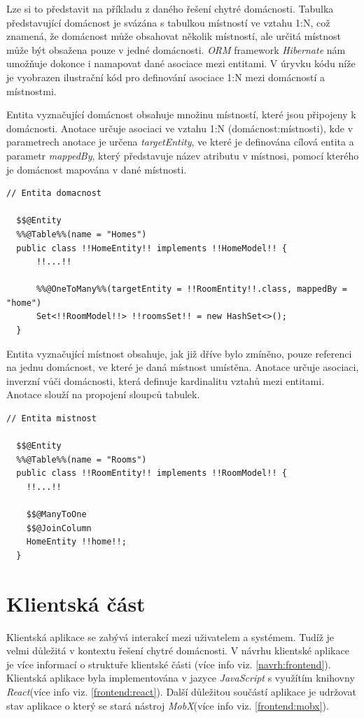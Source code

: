 Lze si to představit na příkladu z daného řešení chytré domácnosti.
Tabulka představující domácnost je svázána s tabulkou místností ve vztahu 1:N, což znamená, že domácnost může obsahovat několik místností, ale určitá místnost může být obsažena pouze v jedné domácnosti.
\emph{ORM} framework \emph{Hibernate} nám umožňuje dokonce i namapovat dané asociace mezi entitami.
V úryvku kódu níže je vyobrazen ilustrační kód pro definování asociace 1:N mezi domácností a místnostmi.

Entita vyznačující domácnost obsahuje množinu místností, které jsou připojeny k domácnosti.
Anotace  určuje asociaci ve vztahu 1:N (domácnost:místnosti), kde v parametrech anotace je určena \emph{targetEntity}, ve které je definována cílová entita a
parametr \emph{mappedBy}, který představuje název atributu v místnosi, pomocí kterého je domácnost mapována v dané místnosti.

\begin{lstlisting}[style=JavaStyle, caption={Ukázka asociace 1:N (domácnost:místnosti)}]
  // Entita domacnost
  
  $$@Entity
  %%@Table%%(name = "Homes")
  public class !!HomeEntity!! implements !!HomeModel!! {
      !!...!!

      %%@OneToMany%%(targetEntity = !!RoomEntity!!.class, mappedBy = "home")
      Set<!!RoomModel!!> !!roomsSet!! = new HashSet<>();
  }
\end{lstlisting}

Entita vyznačující místnost obsahuje, jak již dříve bylo zmíněno, pouze referenci na jednu domácnost, ve které je daná místnost umístěna.
Anotace  určuje asociaci, inverzní vůči domácnosti, která definuje kardinalitu vztahů mezi entitami.
Anotace  slouží na propojení sloupců tabulek.

\begin{lstlisting}[style=JavaStyle,caption={Ukázka asociace 1:N (domácnost:místnosti)}]
  // Entita mistnost
  
  $$@Entity
  %%@Table%%(name = "Rooms")
  public class !!RoomEntity!! implements !!RoomModel!! {
    !!...!!

    $$@ManyToOne
    $$@JoinColumn
    HomeEntity !!home!!;
  }
\end{lstlisting}

\newpage
\section{Klientská část}
\label{impl:frontend}
Klientská aplikace se zabývá interakcí mezi uživatelem a systémem.
Tudíž je velmi důležitá v kontextu řešení chytré domácnosti.
V návrhu klientské aplikace je více informací o struktuře klientské části (více info viz. \ref{navrh:frontend}).
Klientská aplikace byla implementována v jazyce \emph{JavaScript} s využítím knihovny \emph{React}(více info viz. \ref{frontend:react}).
Další důležitou součástí aplikace je udržovat stav aplikace o který se stará nástroj \emph{MobX}(více info viz. \ref{frontend:mobx}).

